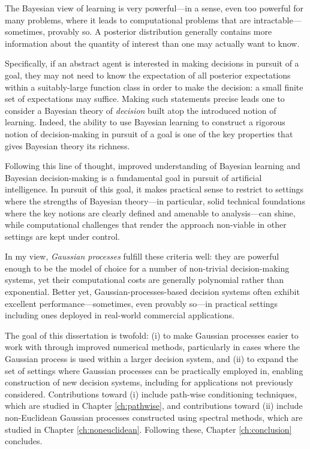 \documentclass[11pt]{book}
\begin{document}
The Bayesian view of learning is very powerful---in a sense, even too powerful for many problems, where it leads to computational problems that are intractable---sometimes, provably so.
A posterior distribution generally contains more information about the quantity of interest than one may actually want to know.

Specifically, if an abstract agent is interested in making decisions in pursuit of a goal, they may not need to know the expectation of all posterior expectations within a suitably-large function class in order to make the decision: a small finite set of expectations may suffice.
Making such statements precise leads one to consider a Bayesian theory of \emph{decision} built atop the introduced notion of learning.
Indeed, the ability to use Bayesian learning to construct a rigorous notion of decision-making in pursuit of a goal is one of the key properties that gives Bayesian theory its richness.

Following this line of thought, improved understanding of Bayesian learning and Bayesian decision-making is a fundamental goal in pursuit of artificial intelligence.
In pursuit of this goal, it makes practical sense to restrict to settings where the strengths of Bayesian theory---in particular, solid technical foundations where the key notions are clearly defined and amenable to analysis---can shine, while computational challenges that render the approach non-viable in other settings are kept under control.

In my view, \emph{Gaussian processes} fulfill these criteria well: they are powerful enough to be the model of choice for a number of non-trivial decision-making systems, yet their computational costs are generally polynomial rather than exponential.
Better yet, Gaussian-processes-based decision systems often exhibit excellent performance---sometimes, even provably so---in practical settings including ones deployed in real-world commercial applications.

The goal of this dissertation is twofold: (i) to make Gaussian processes easier to work with through improved numerical methods, particularly in cases where the Gaussian process is used within a larger decision system, and (ii) to expand the set of settings where Gaussian processes can be practically employed in, enabling construction of new decision systems, including for applications not previously considered.
Contributions toward (i) include path-wise conditioning techniques, which are studied in Chapter \ref{ch:pathwise}, and contributions toward (ii) include non-Euclidean Gaussian processes constructed using spectral methods, which are studied in Chapter \ref{ch:noneuclidean}.
Following these, Chapter \ref{ch:conclusion} concludes.
\end{document}

